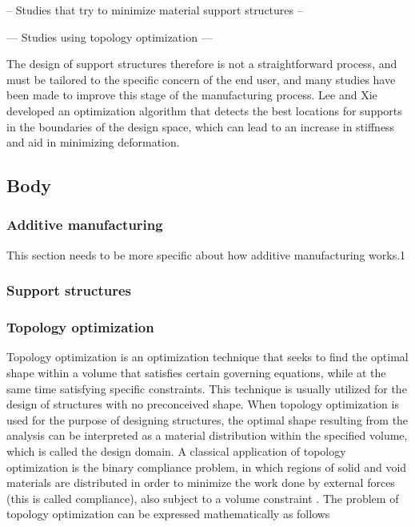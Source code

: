 \documentclass[../main.tex]{subfiles}
\begin{document}
-- Studies that try to minimize material support structures --


--- Studies using topology optimization ---

The design of support structures therefore is not a straightforward process, and must be tailored to the specific concern of the end user, and many studies have been made to improve this stage of the manufacturing process. Lee and Xie \cite{leeSimultaneouslyOptimizingSupports2001} developed an optimization algorithm that detects the best locations for supports in the boundaries of the design space, which can lead to an increase in stiffness and aid in minimizing deformation.

\subsection{Body}

\subsubsection{Additive manufacturing}

This section needs to be more specific about how additive manufacturing works.1

\subsubsection{Support structures}

\subsubsection{Topology optimization}

Topology optimization is an optimization technique that seeks to find the optimal shape within a volume that satisfies certain governing equations, while at the same time satisfying specific constraints. This technique is usually utilized for the design of structures with no preconceived shape. When topology optimization is used for the purpose of designing structures, the optimal shape resulting from the analysis can be interpreted as a material distribution within the specified volume, which is called the design domain. A classical application of topology optimization is the binary compliance problem, in which regions of solid and void materials are distributed in order to minimize the work done by external forces (this is called compliance), also subject to a volume constraint \cite{liuEfficient3DTopology2014}. The problem of topology optimization can be expressed mathematically as follows \cite{lazarovFiltersTopologyOptimization2011}
\end{document}
